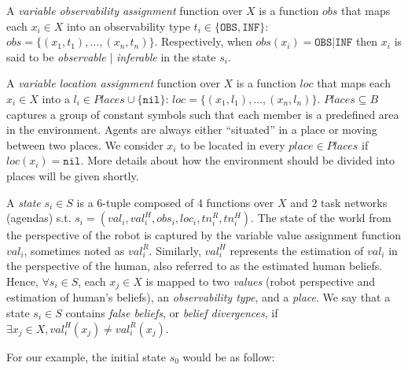A \textit{variable observability assignment} function over $X$ is a function $obs$ that maps each $x_i \in X$ into an observability type $t_i \in \{ \texttt{OBS},  \texttt{INF} \}$: $obs = \{ (x_1,t_1), \ldots , (x_n,t_n) \}$. Respectively, when $obs(x_i) = \texttt{OBS} | \texttt{INF}$ then $x_i$ is said to be \textit{observable} $|$ \textit{inferable} in the state $s_i$.

A \textit{variable location assignment} function over $X$ is a function $loc$ that maps each $x_i \in X$ into a $l_i \in Places \cup \{ \texttt{nil} \}$: $loc = \{ (x_1,l_1), ..., (x_n,l_n) \}$. 
$Places \subseteq B$ captures a group of constant symbols such that each member is a predefined area in the environment. 
Agents are always either ``situated'' in a place or moving between two places. 
We consider $x_i$ to be located in every $place \in Places$ if $loc(x_i)=\texttt{nil}$. 
More details about how the environment should be divided into places will be given shortly.

A \textit{state} $s_i \in S$ is a 6-tuple composed of 4 functions over $X$ and 2 task networks (agendas)  s.t. $s_i = (val_i, val^H_i, obs_i, loc_i, tn^R_i, tn^H_i)$. 
The state of the world from the perspective of the robot is captured by the variable value assignment function $val_i$, sometimes noted as $val^R_i$. 
Similarly, $val^H_i$ represents the estimation of $val_i$ in the perspective of the human, also referred to as the estimated human beliefs. 
Hence, $\forall s_i \in S$, each $x_j \in X$ is  mapped to two \textit{values} (robot perspective and estimation of human's beliefs), an \textit{observability type}, and a \textit{place}. We say that a state $s_i \in S$ contains \textit{false beliefs}, or \textit{belief divergences}, if $\exists x_j \in X, val^H_i(x_j) \neq val^R_i(x_j)$. 

For our example, the initial state $s_0$ would be as follow: 

\newcommand{\smallvspace}{\vspace{-0.8cm}}
\newcommand{\bigvspace}{\vspace{-1.3cm}}

